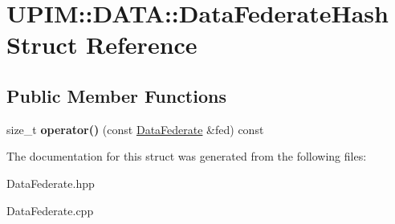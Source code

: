 \hypertarget{structUPIM_1_1DATA_1_1DataFederateHash}{}\section{U\+P\+IM\+:\+:D\+A\+TA\+:\+:Data\+Federate\+Hash Struct Reference}
\label{structUPIM_1_1DATA_1_1DataFederateHash}
\subsection*{Public Member Functions}
\begin{DoxyCompactItemize}
\item 
\mbox{\label{structUPIM_1_1DATA_1_1DataFederateHash_a4610bc7977f5c065a23c6c59b6dcf87a}} 
size\+\_\+t {\bfseries operator()} (const \hyperlink{classUPIM_1_1DATA_1_1DataFederate}{Data\+Federate} \&fed) const
\end{DoxyCompactItemize}


The documentation for this struct was generated from the following files\+:\begin{DoxyCompactItemize}
\item 
Data\+Federate.\+hpp\item 
Data\+Federate.\+cpp\end{DoxyCompactItemize}

